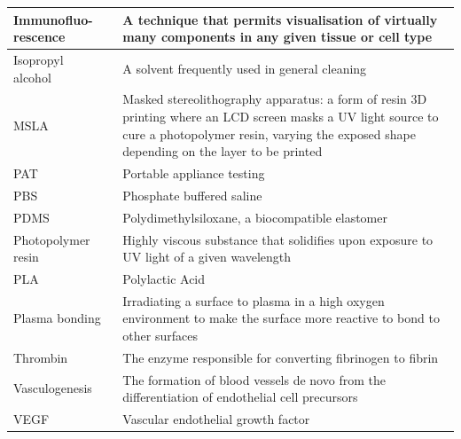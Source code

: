 \documentclass[letterpaper,12pt]{article}
\begin{document}
\begin{table}[!h]
\begin{tabular}{|m{3cm} |m{14cm} |}
\hline
Immunofluo- rescence  & A technique that permits visualisation of virtually many components in any given tissue or cell type  \\
\hline
Isopropyl alcohol  & A solvent frequently used in general cleaning  \\
\hline
MSLA  & Masked stereolithography apparatus: a form of resin 3D printing where an LCD screen masks a UV light source to cure a photopolymer resin, varying the exposed shape depending on the layer to be printed  \\
\hline
PAT  & Portable appliance testing  \\
\hline
PBS  & Phosphate buffered saline  \\
\hline
PDMS  & Polydimethylsiloxane, a biocompatible elastomer  \\
\hline
Photopolymer resin  & Highly viscous substance that solidifies upon exposure to UV light of a given wavelength  \\
\hline
PLA  & Polylactic Acid  \\
\hline
Plasma bonding  & Irradiating a surface to plasma in a high oxygen environment to make the surface more reactive to bond to other surfaces  \\
\hline
Thrombin  & The enzyme responsible for converting fibrinogen to fibrin  \\
\hline
Vasculogenesis  & The formation of blood vessels de novo from the differentiation of endothelial cell precursors  \\
\hline
VEGF  & Vascular endothelial growth factor  \\
\hline

\end{tabular}

\end{table}
~
 
\end{document}
